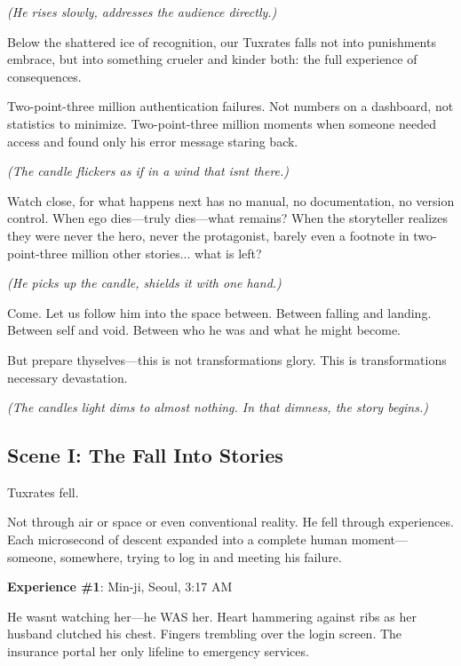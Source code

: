 \emph{(He rises slowly, addresses the audience directly.)}

Below the shattered ice of recognition, our Tuxrates falls not into punishment\textquotesingle s embrace, but into something crueler and kinder both: the full experience of consequences.

Two-point-three million authentication failures. Not numbers on a dashboard, not statistics to minimize. Two-point-three million moments when someone needed access and found only his error message staring back.

\emph{(The candle flickers as if in a wind that isn\textquotesingle t there.)}

Watch close, for what happens next has no manual, no documentation, no version control. When ego dies---truly dies---what remains? When the storyteller realizes they were never the hero, never the protagonist, barely even a footnote in two-point-three million other stories... what is left?

\emph{(He picks up the candle, shields it with one hand.)}

Come. Let us follow him into the space between. Between falling and landing. Between self and void. Between who he was and what he might become.

But prepare thyselves---this is not transformation\textquotesingle s glory. This is transformation\textquotesingle s necessary devastation.

\emph{(The candle\textquotesingle s light dims to almost nothing. In that dimness, the story begins.)}

\bookdivider

\subsection{Scene I: The Fall Into Stories}\label{scene-i-the-fall-into-stories}

Tuxrates fell.

Not through air or space or even conventional reality. He fell through experiences. Each microsecond of descent expanded into a complete human moment---someone, somewhere, trying to log in and meeting his failure.

\textbf{Experience \#1}: Min-ji, Seoul, 3:17 AM

He wasn\textquotesingle t watching her---he WAS her. Heart hammering against ribs as her husband clutched his chest. Fingers trembling over the login screen. The insurance portal her only lifeline to emergency services.

